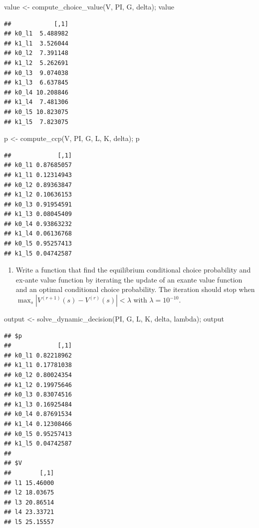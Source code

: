 \documentclass[
]{book}
\newenvironment{Shaded}{\begin{snugshade}}{\end{snugshade}}
\newcommand{\FunctionTok}[1]{\textcolor[rgb]{0.00,0.00,0.00}{#1}}
\newcommand{\NormalTok}[1]{#1}
\newcommand{\OtherTok}[1]{\textcolor[rgb]{0.56,0.35,0.01}{#1}}
\providecommand{\tightlist}{%
  \setlength{\itemsep}{0pt}\setlength{\parskip}{0pt}}
\begin{document}
\begin{Shaded}
\begin{Highlighting}[]
\NormalTok{value }\OtherTok{\textless{}{-}} \FunctionTok{compute\_choice\_value}\NormalTok{(V, PI, G, delta); value}
\end{Highlighting}
\end{Shaded}

\begin{verbatim}
##            [,1]
## k0_l1  5.488982
## k1_l1  3.526044
## k0_l2  7.391148
## k1_l2  5.262691
## k0_l3  9.074038
## k1_l3  6.637845
## k0_l4 10.208846
## k1_l4  7.481306
## k0_l5 10.823075
## k1_l5  7.823075
\end{verbatim}

\begin{Shaded}
\begin{Highlighting}[]
\NormalTok{p }\OtherTok{\textless{}{-}} \FunctionTok{compute\_ccp}\NormalTok{(V, PI, G, L, K, delta); p}
\end{Highlighting}
\end{Shaded}

\begin{verbatim}
##             [,1]
## k0_l1 0.87685057
## k1_l1 0.12314943
## k0_l2 0.89363847
## k1_l2 0.10636153
## k0_l3 0.91954591
## k1_l3 0.08045409
## k0_l4 0.93863232
## k1_l4 0.06136768
## k0_l5 0.95257413
## k1_l5 0.04742587
\end{verbatim}

\begin{enumerate}
\def\labelenumi{\arabic{enumi}.}
\setcounter{enumi}{4}
\tightlist
\item
  Write a function that find the equilibrium conditional choice probability and ex-ante value function by iterating the update of an exante value function and an optimal conditional choice probability. The iteration should stop when \(\max_s|V^{(r + 1)}(s) - V^{(r)}(s)| < \lambda\) with \(\lambda = 10^{-10}\).
\end{enumerate}

\begin{Shaded}
\begin{Highlighting}[]
\NormalTok{output }\OtherTok{\textless{}{-}} \FunctionTok{solve\_dynamic\_decision}\NormalTok{(PI, G, L, K, delta, lambda); output}
\end{Highlighting}
\end{Shaded}

\begin{verbatim}
## $p
##             [,1]
## k0_l1 0.82218962
## k1_l1 0.17781038
## k0_l2 0.80024354
## k1_l2 0.19975646
## k0_l3 0.83074516
## k1_l3 0.16925484
## k0_l4 0.87691534
## k1_l4 0.12308466
## k0_l5 0.95257413
## k1_l5 0.04742587
## 
## $V
##        [,1]
## l1 15.46000
## l2 18.03675
## l3 20.86514
## l4 23.33721
## l5 25.15557
\end{verbatim}
\end{document}
